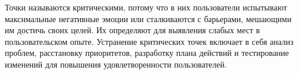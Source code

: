 \begin{enumerate}
Точки называются критическими, потому что в них пользователи испытывают максимальные негативные эмоции или сталкиваются с барьерами, мешающими им достичь своих целей. Их определяют для выявления слабых мест в пользовательском опыте. Устранение критических точек включает в себя анализ проблем, расстановку приоритетов, разработку плана действий и тестирование изменений для повышения удовлетворенности пользователей.
\end{enumerate}


